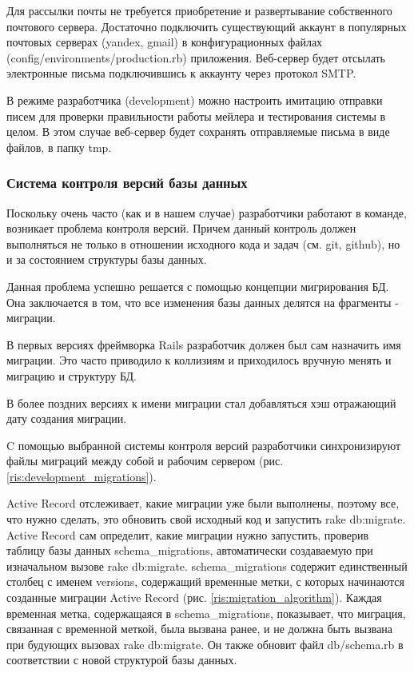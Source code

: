 Для рассылки почты не требуется приобретение и развертывание собственного
почтового сервера. Достаточно подключить существующий аккаунт в популярных
почтовых серверах (yandex, gmail) в конфигурационных файлах
(config/environments/production.rb) приложения. Веб-сервер будет отсылать
электронные письма подключившись к аккаунту через протокол SMTP.

В режиме разработчика (development) можно настроить имитацию отправки писем для
проверки правильности работы мейлера и тестирования системы в целом. В этом
случае веб-сервер будет сохранять отправляемые письма в виде файлов, в папку
tmp.

\subsubsection{Система контроля версий базы данных}
Поскольку очень часто (как и в нашем случае) разработчики работают в команде,
возникает проблема контроля версий. Причем данный контроль должен выполняться не
только в отношении исходного кода и задач (см. git, github), но и за состоянием
структуры базы данных.

Данная проблема успешно решается с помощью концепции мигрирования БД. Она
заключается в том, что все изменения базы данных делятся на фрагменты -
миграции.

В первых версиях фреймворка Rails разработчик должен был сам назначить имя
миграции. Это часто приводило к коллизиям и приходилось вручную менять и
миграцию и структуру БД.

В более поздних версиях к имени миграции стал добавляться хэш отражающий дату
создания миграции.

C помощью выбранной системы контроля версий разработчики синхронизируют файлы
миграций между собой и рабочим сервером (рис. \ref{ris:development_migrations}).

Active Record отслеживает, какие миграции уже были выполнены, поэтому все, что
нужно сделать, это обновить свой исходный код и запустить rake db:migrate.
Active Record сам определит, какие миграции нужно запустить, проверив таблицу
базы данных schema\_migrations, автоматически создаваемую при изначальном вызове
rake db:migrate. schema\_migrations содержит единственный столбец с именем
versions, содержащий временные метки, с которых начинаются созданные миграции
Active Record (рис. \ref{ris:migration_algorithm}). Каждая временная метка,
содержащаяся в schema\_migrations, показывает, что миграция, связанная с временной меткой, была
вызвана ранее, и не должна быть вызвана при будующих вызовах rake db:migrate. Он
также обновит файл db/schema.rb в соответствии с новой структурой базы данных.

